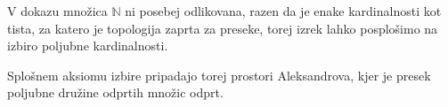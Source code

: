 




\begin{opomba}
  V dokazu množica \(ℕ\) ni posebej odlikovana, razen da je enake kardinalnosti
  kot tista, za katero je topologija zaprta za preseke, torej izrek lahko
  posplošimo na izbiro poljubne kardinalnosti.

  Splošnem aksiomu izbire pripadajo torej prostori Aleksandrova, kjer je presek
  poljubne družine odprtih množic odprt.
\end{opomba}


